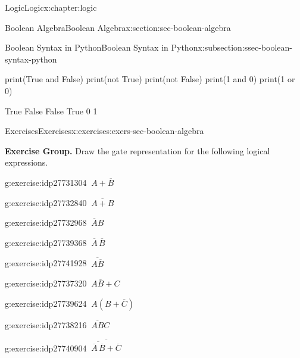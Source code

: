 \documentclass[twoside,10pt,]{book}
\numberwithin{equation}{section}
\begin{document}
\begin{chapterptx}{Logic}{}{Logic}{}{}{x:chapter:logic}
\begin{sectionptx}{Boolean Algebra}{}{Boolean Algebra}{}{}{x:section:sec-boolean-algebra}
\begin{subsectionptx}{Boolean Syntax in Python}{}{Boolean Syntax in Python}{}{}{x:subsection:ssec-boolean-syntax-python}
\begin{sageinput}
print(True and False)
print(not True)
print(not False)
print(1 and 0)
print(1 or 0)
\end{sageinput}
\begin{sageoutput}
True
False
False
True
0
1
\end{sageoutput}
%
\end{subsectionptx}
%
%
\typeout{************************************************}
\typeout{************************************************}
%
\begin{exercises-subsection}{Exercises}{}{Exercises}{}{}{x:exercises:exers-sec-boolean-algebra}
\par\medskip\noindent%
\textbf{Exercise Group.}\space\space%
Draw the gate representation for the following logical expressions.\begin{exercisegroup}
\begin{divisionexerciseeg}{1}{}{}{g:exercise:idp27731304}%
\(\ A+\overline{B}\)\end{divisionexerciseeg}%
\begin{divisionexerciseeg}{2}{}{}{g:exercise:idp27732840}%
\(\ \overline{A+B}\)\end{divisionexerciseeg}%
\begin{divisionexerciseeg}{3}{}{}{g:exercise:idp27732968}%
\(\ \overline{A}{}B\)\end{divisionexerciseeg}%
\begin{divisionexerciseeg}{4}{}{}{g:exercise:idp27739368}%
\(\ \overline{A}\,\overline{B}\)\end{divisionexerciseeg}%
\begin{divisionexerciseeg}{5}{}{}{g:exercise:idp27741928}%
\(\ \overline{A\overline{B}}\)\end{divisionexerciseeg}%
\begin{divisionexerciseeg}{6}{}{}{g:exercise:idp27737320}%
\(\ A\overline{B}+C\)\end{divisionexerciseeg}%
\begin{divisionexerciseeg}{7}{}{}{g:exercise:idp27739624}%
\(\ A(B+\overline{C})\)\end{divisionexerciseeg}%
\begin{divisionexerciseeg}{8}{}{}{g:exercise:idp27738216}%
\(\ \overline{AB}C\)\end{divisionexerciseeg}%
\begin{divisionexerciseeg}{9}{}{}{g:exercise:idp27740904}%
\(\ \overline{\overline{\overline{A}\,\overline{B}}+\overline{C}}\)\end{divisionexerciseeg}%

\end{exercisegroup}
\end{exercises-subsection}
\end{sectionptx}
\end{chapterptx}
\end{document}
